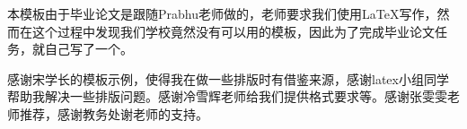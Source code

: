 \begin{Acknowledgement}

    本模板由于毕业论文是跟随Prabhu老师做的，老师要求我们使用\LaTeX{}写作，然而在这个过程中发现我们学校竟然没有可以用的模板，因此为了完成毕业论文任务，就自己写了一个。
    
    感谢宋学长的模板示例，使得我在做一些排版时有借鉴来源，感谢latex小组同学帮助我解决一些排版问题。感谢冷雪辉老师给我们提供格式要求等。感谢张雯雯老师推荐，感谢教务处谢老师的支持。
    
\end{Acknowledgement}